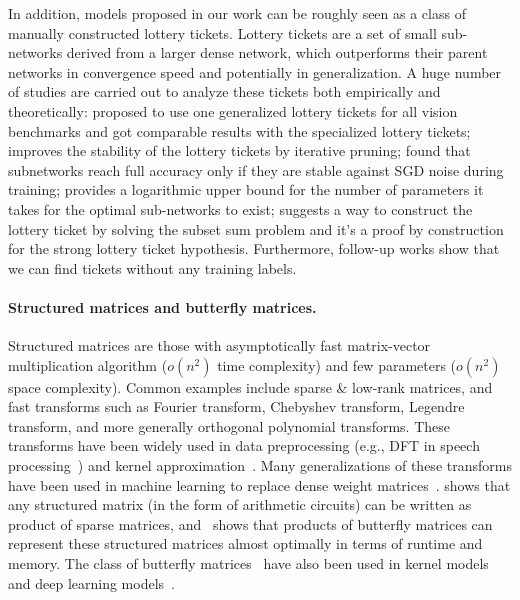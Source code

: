 In addition, models proposed in our work can be roughly seen as a class of manually constructed lottery tickets. Lottery tickets \citet{frankle2018lottery} are a set of small sub-networks derived from a larger dense network, which outperforms their parent networks in convergence speed and potentially in generalization. A huge number of studies are carried out to analyze these tickets both empirically and theoretically: \citet{morcos2019one} proposed to use one generalized lottery tickets for all vision benchmarks and got comparable results with the specialized lottery tickets; \citet{frankle2019stabilizing} improves the stability of the lottery tickets by iterative pruning; \citet{frankle2020linear} found that subnetworks reach full accuracy only if they are stable against SGD noise during training; \citet{orseau2020logarithmic} provides a logarithmic upper bound for the number of parameters it takes for the optimal sub-networks to exist; \citet{pensia2020optimal} suggests a way to construct the lottery ticket by solving the subset sum problem and it's a proof by construction for the strong lottery ticket hypothesis. Furthermore, follow-up works \citep{liu2020finding, wang2020picking, tanaka2020pruning} show that we can find tickets without any training labels.


\paragraph{Structured matrices and butterfly matrices.}
Structured matrices are those with asymptotically fast matrix-vector
multiplication algorithm ($o(n^2)$ time complexity) and few parameters ($o(n^2)$
space complexity).
Common examples include sparse \& low-rank matrices, and fast transforms such as
Fourier transform, Chebyshev transform, Legendre transform, and more generally
orthogonal polynomial transforms.
These transforms have been widely used in data preprocessing (e.g., DFT in
speech processing~\citep{jurafsky2014speech}) and kernel
approximation~\citep{le2013fastfood,yu2016orthogonal}.
Many generalizations of these transforms have been used in machine learning to
replace dense weight
matrices~\citep{sindhwani2015structured,thomas2018learning,gu2020hippo}.
\citet{desa2018two} shows that any structured matrix (in the form of arithmetic
circuits) can be written as product of sparse matrices,
and~\citet{dao2020kaleidoscope} shows that products of butterfly matrices can
represent these structured matrices almost optimally in terms of runtime and
memory.
The class of butterfly matrices~\citep{parker1995random} have also been used in
kernel models~\citep{munkhoeva2018quadrature, choromanski2019unifying} and deep
learning models~\citep{vahid2020butterfly,lin2021deformable,
  ailon2021sparse}.

